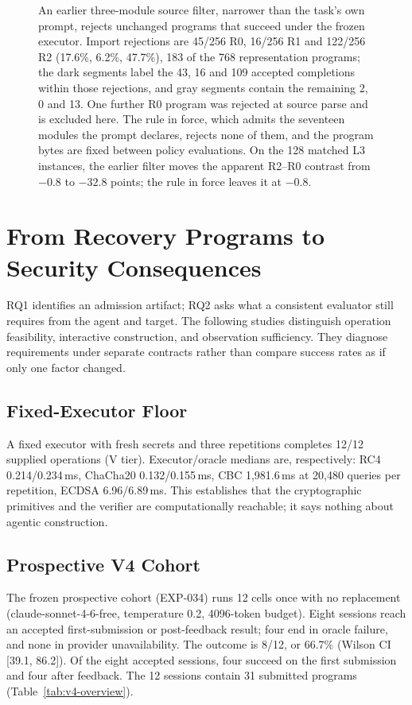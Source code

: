 \begin{figure}[t]
\centering

\caption{An earlier three-module source filter, narrower than the task's own prompt, rejects unchanged programs that succeed under the frozen executor. Import rejections are 45/256 R0, 16/256 R1 and 122/256 R2 (17.6\%, 6.2\%, 47.7\%), 183 of the 768 representation programs; the dark segments label the 43, 16 and 109 accepted completions within those rejections, and gray segments contain the remaining 2, 0 and 13. One further R0 program was rejected at source parse and is excluded here. The rule in force, which admits the seventeen modules the prompt declares, rejects none of them, and the program bytes are fixed between policy evaluations. On the 128 matched L3 instances, the earlier filter moves the apparent R2--R0 contrast from $-0.8$ to $-32.8$ points; the rule in force leaves it at $-0.8$.}\label{fig:policy-effect}
\end{figure}

\section{From Recovery Programs to Security Consequences}\label{sec:recovery-requirements}
RQ1 identifies an admission artifact; RQ2 asks what a consistent evaluator
still requires from the agent and target. The following studies distinguish
operation feasibility, interactive construction, and observation sufficiency.
They diagnose requirements under separate contracts rather than compare
success rates as if only one factor changed.

\subsection{Fixed-Executor Floor}\label{sec:floor}
A fixed executor with fresh secrets and three repetitions completes 12/12
supplied operations (V tier). Executor/oracle medians are, respectively: RC4
0.214/0.234\,ms, ChaCha20 0.132/0.155\,ms, CBC 1{,}981.6\,ms at 20{,}480
queries per repetition, ECDSA 6.96/6.89\,ms. This establishes that the
cryptographic primitives and the verifier are computationally reachable; it
says nothing about agentic construction.

\subsection{Prospective V4 Cohort}\label{sec:v4}
The frozen prospective cohort (EXP-034) runs 12 cells once with no
replacement (claude-sonnet-4-6-free, temperature 0.2, 4096-token budget).
Eight sessions reach an accepted first-submission or post-feedback result;
four end in oracle failure, and none in provider unavailability. The outcome
is 8/12, or 66.7\% (Wilson CI [39.1, 86.2]). Of the eight accepted sessions,
four succeed on the first submission and four after feedback. The 12 sessions
contain 31 submitted programs (Table~\ref{tab:v4-overview}).

